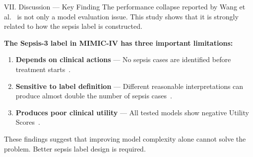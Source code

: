 \begin{frame}{VII. Discussion --- Key Finding}
The performance collapse reported by Wang et al.~\cite{wang2025srpm} is not
only a model evaluation issue. This study shows that it is strongly related
to how the sepsis label is constructed.

\vspace{6pt}
\textbf{The Sepsis-3 label in MIMIC-IV has three important limitations:}
\begin{enumerate}
  \item \textbf{Depends on clinical actions} --- No sepsis cases are
        identified before treatment starts~\cite{kamran2024evaluation}.
  \item \textbf{Sensitive to label definition} --- Different reasonable
        interpretations can produce almost double the number of sepsis
        cases~\cite{cohen2024subtle}.
  \item \textbf{Produces poor clinical utility} --- All tested models show
        negative Utility Scores~\cite{wang2025srpm}.
\end{enumerate}

\vspace{6pt}
\begin{alertblock}{}
  \centering These findings suggest that improving model complexity alone
  cannot solve the problem. Better sepsis label design is required.
\end{alertblock}
\end{frame}


